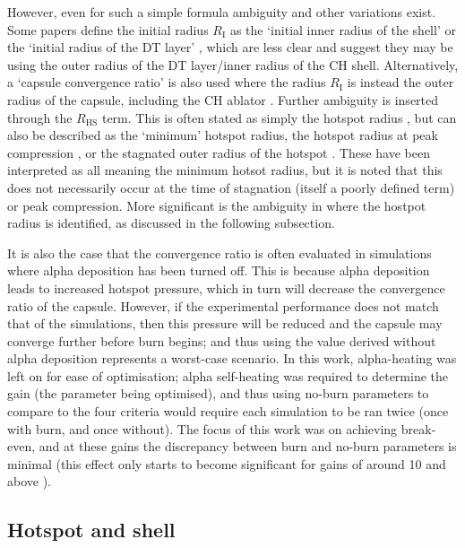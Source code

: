 However, even for such a simple formula ambiguity and other variations exist. Some papers define the initial radius $R_\mathrm{I}$ as the `initial inner radius of the shell' \cite{Craxton2015} or the `initial radius of the DT layer' \cite{Haines2017a}, which are less clear and suggest they may be using the outer radius of the DT layer/inner radius of the CH shell. Alternatively, a `capsule convergence ratio' is also used where the radius $R_\mathrm{I}$ is instead the outer radius of the capsule, including the CH ablator \cite{Lindl2004}. Further ambiguity is inserted through the $R_\mathrm{HS}$ term. This is often stated as simply the hotspot radius \cite{Olson2016, Olson2021}, but can also be described as the `minimum' hotspot radius, the hotspot radius at peak compression \cite{Craxton2015}, or the stagnated outer radius of the hotspot \cite{Zylstra2018}. These have been interpreted as all meaning the minimum hotsot radius, but it is noted that this does not necessarily occur at the time of stagnation (itself a poorly defined term) or peak compression. More significant is the ambiguity in where the hostpot radius is identified, as discussed in the following subsection.

It is also the case that the convergence ratio is often evaluated in simulations where alpha deposition has been turned off. This is because alpha deposition leads to increased hotspot pressure, which in turn will decrease the convergence ratio of the capsule. However, if the experimental performance does not match that of the simulations, then this pressure will be reduced and the capsule may converge further before burn begins; and thus using the value derived without alpha deposition represents a worst-case scenario. In this work, alpha-heating was left on for ease of optimisation; alpha self-heating was required to determine the gain (the parameter being optimised), and thus using no-burn parameters to compare to the four criteria would require each simulation to be ran twice (once with burn, and once without). The focus of this work was on achieving break-even, and at these gains the discrepancy between burn and no-burn parameters is minimal (this effect only starts to become significant for gains of around 10 and above \cite{GoncharovPersonalComm}).

\subsection{Hotspot and shell}

